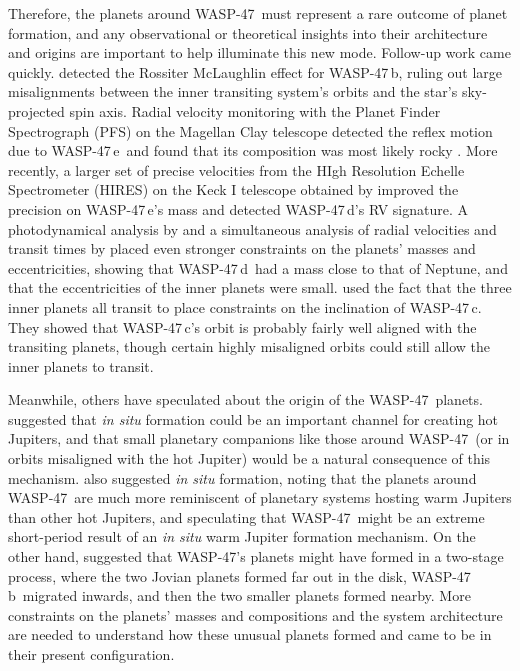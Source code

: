 \documentclass{emulateapj}
\newcommand{\ron}{\color{black}}
\newcommand{\thisstar}{WASP-47}
\newcommand{\thisfirstplanet}{WASP-47\,b}
\newcommand{\thissecondplanet}{WASP-47\,e}
\newcommand{\thisthirdplanet}{WASP-47\,d}
\newcommand{\thisfourthplanet}{WASP-47\,c}
\begin{document}
Therefore, the planets around \thisstar\ must represent a rare outcome of planet formation, and any observational or theoretical insights into their architecture and origins are important to help illuminate this new mode. Follow-up work came quickly. \citet{sanchisojedaw47rm} detected the Rossiter McLaughlin effect for \thisfirstplanet, ruling out large misalignments between the inner transiting system's orbits and the star's sky-projected spin axis. Radial velocity monitoring with the Planet Finder Spectrograph (PFS) on the Magellan Clay telescope detected the reflex motion due to \thissecondplanet\ and found that its composition was most likely rocky \citep{dai}. More recently, a larger set of precise velocities from the HIgh Resolution Echelle Spectrometer (HIRES) on the Keck I telescope obtained by \citet{sinukoffw47} improved the precision on \thissecondplanet's mass and detected \thisthirdplanet's RV signature. A photodynamical analysis by \citet{almenara} and a simultaneous analysis of radial velocities and transit times by \citet{weissw47} placed even stronger constraints on the planets' masses and eccentricities, showing that \thisthirdplanet\ had a mass close to that of Neptune, and that the eccentricities of the inner planets were small. \citet{beckeradams} used the fact that the three inner planets all transit to place constraints on the inclination of \thisfourthplanet. They showed that \thisfourthplanet's orbit is probably fairly well aligned with the transiting planets, though certain highly misaligned orbits could still allow the inner planets to transit.

Meanwhile, others have speculated about the origin of the \thisstar\ planets. \citet{batygin} suggested that {\em in situ} formation could be an important channel for creating hot Jupiters, and that small planetary companions like those around \thisstar\ (or in orbits misaligned with the hot Jupiter) would be a natural consequence of this mechanism. \citet{huangwarmjupiter} also suggested {\em in situ} formation, noting that the planets around \thisstar\ are much more reminiscent of planetary systems hosting warm Jupiters than other hot Jupiters, and speculating that \thisstar\ might be an extreme short-period result of an {\em in situ} warm Jupiter formation mechanism. On the other hand, \citet{weissw47} suggested that \thisstar's planets might have formed in a two-stage process, where the two Jovian planets formed far out in the disk, \thisfirstplanet\ migrated inwards, and then the two smaller planets  formed nearby. More constraints on the {\ron planets'} masses and compositions and the system architecture are needed to understand how these unusual planets formed and came to be in their present configuration. 
\end{document}
